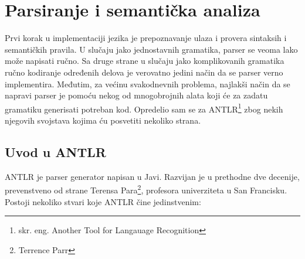 \chapter{Parsiranje i semantička analiza}

Prvi korak u implementaciji jezika je prepoznavanje ulaza i provera sintaksih i semantičkih pravila. U slučaju jako jednostavnih gramatika, parser se veoma lako može napisati ručno. Sa druge strane u slučaju jako komplikovanih gramatika ručno kodiranje određenih delova je verovatno jedini način da se parser verno implementira. Međutim, za većinu svakodnevnih problema, najlakši način da se napravi parser je pomoću nekog od mnogobrojnih alata koji će za zadatu gramatiku generisati potreban kod. Opredelio sam se za ANTLR\footnote{skr. eng. Another Tool for Langauage Recognition} zbog nekih njegovih svojstava kojima ću posvetiti nekoliko strana.

\section{Uvod u ANTLR}

ANTLR je parser generator napisan u Javi. Razvijan je u prethodne dve decenije, prevenstveno od strane Terensa Para\footnote{Terrence Parr}, profesora univerziteta u San Francisku. Postoji nekoliko stvari koje ANTLR čine jedinstvenim\cite{antlr-contrib}:

